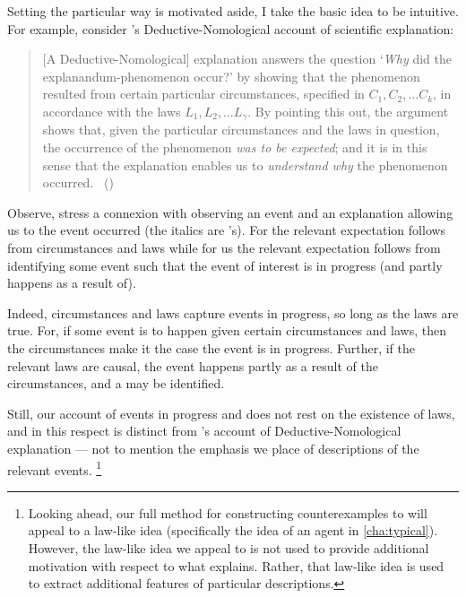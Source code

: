 \begin{note}%
  \nocite{Bromberger:1966aa}%
  Setting the particular way \progEx{} is motivated aside, I take the basic idea to be intuitive.
  For example, consider \citeauthor{Hempel:1965aa}'s Deductive-Nomological account of scientific explanation:
  \begin{quote}
    [A Deductive-Nomological] explanation answers the question
    `\emph{Why} did the explanandum-phenomenon occur?'
    by showing that the phenomenon resulted from certain particular circumstances, specified in \(C_{1}, C_{2}, \dots C_{k}\), in accordance with the laws \(L_{1}, L_{2}, \dots L_{\gamma}\).
    By pointing this out, the argument shows that, given the particular circumstances and the laws in question, the occurrence of the phenomenon \emph{was to be expected}; and it is in this sense that the explanation enables us to \emph{understand why} the phenomenon occurred.%
    \mbox{ }\hfill\mbox{(\citeyear[337]{Hempel:1965aa})}
  \end{quote}
  Observe, \citeauthor{Hempel:1965aa} stress a connexion with observing an event  and an explanation allowing us to  the event occurred (the italics are \citeauthor{Hempel:1965aa}'s).
  For \citeauthor{Hempel:1965aa} the relevant expectation follows from circumstances and laws while for us the relevant expectation follows from identifying some event such that the event of interest is in progress (and partly happens as a result of).

  Indeed, circumstances and laws capture events in progress, so long as the laws are true.
  For, if some event is to happen given certain circumstances and laws, then the circumstances make it the case the event is in progress.
  Further, if the relevant laws are causal, the event happens partly as a result of the circumstances, and a \se{} may be identified.

  Still, our account of events in progress and \se{} does not rest on the existence of laws, and in this respect \progExI{} is distinct from \citeauthor{Hempel:1965aa}'s account of Deductive-Nomological explanation --- not to mention the emphasis we place of descriptions of the relevant events.%
  \footnote{
    Looking ahead, our full method for constructing counterexamples to \issueInclusion{} will appeal to a law-like idea (specifically the idea of an agent \tC{} in \autoref{cha:typical}).
    However, the law-like idea we appeal to is not used to provide additional motivation with respect to what explains.
    Rather, that law-like idea is used to extract additional features of particular descriptions.
  }
\end{note}




